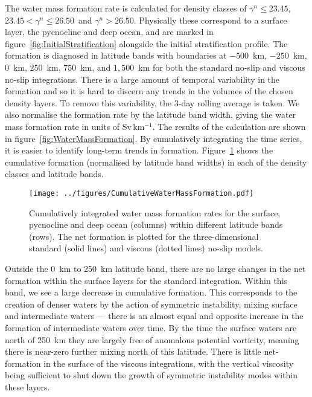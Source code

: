 The water mass formation rate is calculated for density classes of $\gamma^n \leq 23.45$, $23.45 < \gamma^n \leq 26.50$~and $\gamma^n > 26.50$. Physically these correspond to a surface layer, the pycnocline and deep ocean, and are marked in figure~\ref{fig:InitialStratification} alongside the initial stratification profile. The formation is diagnosed in latitude bands with boundaries at $-500$~km, $-250$~km, $0$~km, $250$~km, $750$~km, and $1,500$~km for both the standard no-slip and viscous no-slip integrations. There is a large amount of temporal variability in the formation and so it is hard to discern any trends in the volumes of the chosen density layers. To remove this variability, the 3-day rolling average is taken. We also normalise the formation rate by the latitude band width, giving the water mass formation rate in units of Sv\,km$^{-1}$. The results of the calculation are shown in figure~\ref{fig:WaterMassFormation}. By cumulatively integrating the time series, it is easier to identify long-term trends in formation. Figure~\ref{fig:CumulativeWaterMassFormation} shows the cumulative formation (normalised by latitude band widths) in each of the density classes and latitude bands.

\begin{figure}[p]
    \centering
    \texttt{[image: ../figures/CumulativeWaterMassFormation.pdf]}
    \caption{Cumulatively integrated water mass formation rates for the surface, pycnocline and deep ocean (columns) within different latitude bands (rows). The net formation is plotted for the three-dimensional standard (solid lines) and viscous (dotted lines) no-slip models.}
    \label{fig:CumulativeWaterMassFormation}
\end{figure}

Outside the 0~km to 250~km latitude band, there are no large changes in the net formation within the surface layers for the standard integration. Within this band, we see a large decrease in cumulative formation. This corresponds to the creation of denser waters by the action of symmetric instability, mixing surface and intermediate waters --- there is an almost equal and opposite increase in the formation of intermediate waters over time. By the time the surface waters are north of 250~km they are largely free of anomalous potential vorticity, meaning there is near-zero further mixing north of this latitude. There is little net-formation in the surface of the viscous integrations, with the vertical viscosity being sufficient to shut down the growth of symmetric instability modes within these layers.

